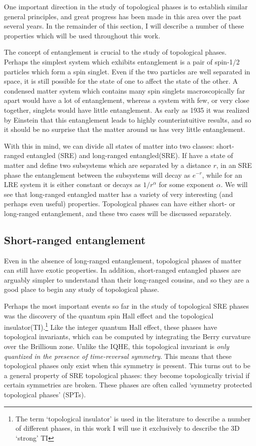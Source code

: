 One important direction in the study of topological phases is to establish similar general principles, and great progress has been made in this area over the past several years. In the remainder of this section, I will describe a number of these properties which will be used throughout this work.

The concept of entanglement is crucial to the study of topological phases. Perhaps the simplest system which exhibits entanglement is a pair of spin-1/2 particles which form a spin singlet. Even if the two particles are well separated in space, it is still possible for the state of one to affect the state of the other. A condensed matter system which contains many spin singlets macroscopically far apart would have a lot of entanglement, whereas a system with few, or very close together, singlets would have little entanglement. As early as 1935 it was realized by Einstein\cite{Einstein} that this entanglement leads to highly counterintuitive results, and so it should be no surprise that the matter around us has very little entanglement.

With this in mind, we can divide all states of matter into two classes: short-ranged entangled (SRE) and long-ranged entangled(SRE). If have a state of matter and define two subsystems which are separated by a distance $r$, in an SRE phase the entanglement between the subsystems will decay as $e^{-r}$, while for an LRE system it is either constant or decays as $1/r^{\alpha}$ for some exponent $\alpha$. We will see that long-ranged entangled matter has a variety of very interesting (and perhaps even useful) properties. Topological phases can have either short- or long-ranged entanglement, and these two cases will be discussed separately.

\subsection{Short-ranged entanglement}

Even in the absence of long-ranged entanglement, topological phases of matter can still have exotic properties. In addition, short-ranged entangled phases are arguably simpler to understand than their long-ranged cousins, and so they are a good place to begin any study of topological phase.

Perhaps the most important events so far in the study of topological SRE phases was the discovery of the quantum spin Hall effect\cite{QSHEreview} and the topological insulator(TI).\cite{KaneHasanRMP,QiZhangRMP}\footnote{The term `topological insulator' is used in the literature to describe a number of different phases, in this work I will use it exclusively to describe the 3D `strong' TI}
Like the integer quantum Hall effect, these phases have topological invariants, which can be computed by integrating the Berry curvature over the Brillioun zone. Unlike the IQHE, this topological invariant is \emph{only quantized in the presence of time-reversal symmetry}. This means that these topological phases only exist when this symmetry is present. This turns out to be a general property of SRE topological phases: they become topologically trivial if certain symmetries are broken. These phases are often called `symmetry protected topological phases' (SPTs).

